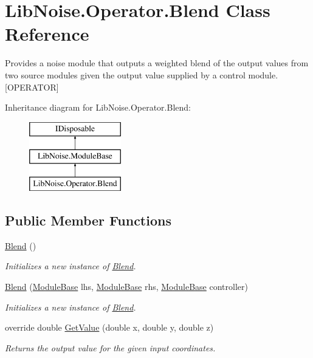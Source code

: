 \hypertarget{class_lib_noise_1_1_operator_1_1_blend}{}\section{Lib\+Noise.\+Operator.\+Blend Class Reference}
\label{class_lib_noise_1_1_operator_1_1_blend}


Provides a noise module that outputs a weighted blend of the output values from two source modules given the output value supplied by a control module. \mbox{[}O\+P\+E\+R\+A\+T\+OR\mbox{]}  


Inheritance diagram for Lib\+Noise.\+Operator.\+Blend\+:\begin{figure}[H]
\begin{center}
\leavevmode
\includegraphics[height=3.000000cm]{class_lib_noise_1_1_operator_1_1_blend}
\end{center}
\end{figure}
\subsection*{Public Member Functions}
\begin{DoxyCompactItemize}
\item 
\hyperlink{class_lib_noise_1_1_operator_1_1_blend_a9a9c47ac7c367d406ac74ec13887a716}{Blend} ()
\begin{DoxyCompactList}\small\item\em Initializes a new instance of \hyperlink{class_lib_noise_1_1_operator_1_1_blend}{Blend}. \end{DoxyCompactList}\item 
\hyperlink{class_lib_noise_1_1_operator_1_1_blend_a0d034c55e93ab3fa586c0909b193a4e3}{Blend} (\hyperlink{class_lib_noise_1_1_module_base}{Module\+Base} lhs, \hyperlink{class_lib_noise_1_1_module_base}{Module\+Base} rhs, \hyperlink{class_lib_noise_1_1_module_base}{Module\+Base} controller)
\begin{DoxyCompactList}\small\item\em Initializes a new instance of \hyperlink{class_lib_noise_1_1_operator_1_1_blend}{Blend}. \end{DoxyCompactList}\item 
override double \hyperlink{class_lib_noise_1_1_operator_1_1_blend_a219527ab0e28be846b61a51cb33634d8}{Get\+Value} (double x, double y, double z)
\begin{DoxyCompactList}\small\item\em Returns the output value for the given input coordinates. \end{DoxyCompactList}\end{DoxyCompactItemize}
